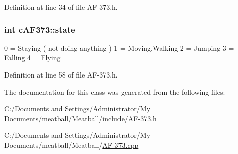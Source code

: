 Definition at line 34 of file A\-F-\/373.\-h.

\hypertarget{classc_a_f373_a32f080552487a891b9794bcce996091e}{
\subsubsection[{state}]{\setlength{\rightskip}{0pt plus 5cm}int c\-A\-F373\-::state}}\label{classc_a_f373_a32f080552487a891b9794bcce996091e}
0 = Staying ( not doing anything ) 1 = Moving,Walking 2 = Jumping 3 = Falling 4 = Flying 

Definition at line 58 of file A\-F-\/373.\-h.



The documentation for this class was generated from the following files\-:\begin{DoxyCompactItemize}
\item 
C\-:/\-Documents and Settings/\-Administrator/\-My Documents/meatball/\-Meatball/include/\hyperlink{_a_f-373_8h}{A\-F-\/373.\-h}\item 
C\-:/\-Documents and Settings/\-Administrator/\-My Documents/meatball/\-Meatball/\hyperlink{_a_f-373_8cpp}{A\-F-\/373.\-cpp}\end{DoxyCompactItemize}
